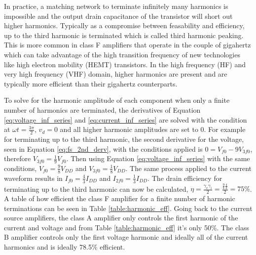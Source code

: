 In practice, a matching network to terminate infinitely many harmonics is impossible and the output drain capacitance of the transistor will short out higher harmonics. Typically as a compromise between feasability and efficiency, up to the third harmonic is terminated which is called third harmonic peaking. This is more common in class F amplifiers that operate in the couple of gigahertz which can take advantage of the high transition frequency of new technologies like high electron mobility (HEMT) transistors. In the high frequency (HF) and very high frequency (VHF) domain, higher harmonics are present and are typically more efficient than their gigahertz counterparts.

To solve for the harmonic amplitude of each component when only a finite number of harmonics are terminated, the derivatives of Equation \ref{eq:voltage_inf_series} and \ref{eq:current_inf_series} are solved with the condition at $\omega t = \frac{3\pi}{2}$, $v_d=0$ and all higher harmonic amplitudes are set to 0. For example for terminating up to the third harmonic, the second derivative for the voltage, seen in Equation \ref{eq:fs_2nd_derv}, with the conditions applied is $0 = V_{f0} - 9V_{3f0}$, therefore $V_{3f0} = \frac{1}{9} V_{f0}$. Then using Equation \ref{eq:voltage_inf_series} with the same conditions, $V_{f0}=\frac{9}{8}V_{DD}$ and $V_{3f0} = \frac{1}{8}V_{DD}$. The same process applied to the current waveform results in $I_{f0}=\frac{4}{3}I_{DD}$ and $I_{2f0} = \frac{1}{3}I_{DD}$. The drain efficiency for terminating up to the third harmonic can now be calculated, $\eta = \frac{\gamma_v \gamma_i}{2} = \frac{ \frac{9}{8} \frac{4}{3} }{2} = 75\%$. A table of how efficient the class F amplifier for a finite number of harmonic terminations can be seen in Table \ref{table:harmonic_eff}. Going back to the current source amplifiers, the class A amplifier only controls the first harmonic of the current and voltage and from Table \ref{table:harmonic_eff} it's only 50\%. The class B amplifier controls only the first voltage harmonic and ideally all of the current harmonics and is ideally 78.5\% efficient. %





